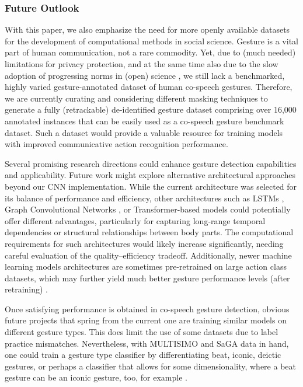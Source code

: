 \documentclass[11pt,smallheadings,cleardoublepage=empty,tocflat,numbers=noenddot,twoside,captions=tableheading]{scrbook}
\begin{document}
\begin{refsection}
\subsubsection{Future Outlook}
With this paper, we also emphasize the need for more openly available datasets for the development of computational methods in social science. Gesture is a vital part of human communication, not a rare commodity. Yet, due to (much needed) limitations for privacy protection, and at the same time also due to the slow adoption of progressing norms in (open) science \parencite{resnikShouldResearchersDestroy2024}, we still lack a benchmarked, highly varied gesture-annotated dataset of human co-speech gestures. Therefore, we are currently curating and considering different masking techniques \parencite{owoyeleMaskedpiperMaskingPersonal2022,owoyeleMaskAnyoneToolkitOffering2024} to generate a fully (retrackable) de-identified gesture dataset comprising over 16,000 annotated instances that can be easily used as a co-speech gesture benchmark dataset. Such a dataset would provide a valuable resource for training models with improved communicative action recognition performance.

 Several promising research directions could enhance gesture detection capabilities and applicability. Future work might explore alternative architectural approaches beyond our CNN implementation. While the current architecture was selected for its balance of performance and efficiency, other architectures such as 
 LSTMs \parencite{shahroudy2016skeleton}, 
Graph Convolutional Networks \parencite{yan2018stgcn, liu2020dcgcn}, or Transformer-based models \parencite{girdhar2019video, jiang2022inception} could potentially offer different advantages, particularly for capturing long-range temporal dependencies or structural relationships between body parts. The computational requirements for such architectures would likely increase significantly, needing careful evaluation of the quality–efficiency tradeoff. Additionally, newer machine learning models architectures are sometimes pre-retrained on large action class datasets, which may further yield much better gesture performance levels (after retraining) \parencite{zhuMotionBERTUnifiedPerspective2023}.


Once satisfying performance is obtained in co-speech gesture detection, obvious future projects that spring from the current one are training similar models on different gesture types. This does limit the use of some datasets due to label practice mismatches. Nevertheless, with MULTISIMO \parencite{koutsombogeraMULTISIMOMultimodalCorpus2017} and SaGA data \parencite{luckingBielefeldSpeechGesture2010} in hand, one could train a gesture type classifier by differentiating beat, iconic, deictic gestures, or perhaps a classifier that allows for some dimensionality, where a beat gesture can be an iconic gesture, too, for example \parencite{rohrerTemporalPragmaticAnalysis2022}. 


\end{refsection}
\end{document}
